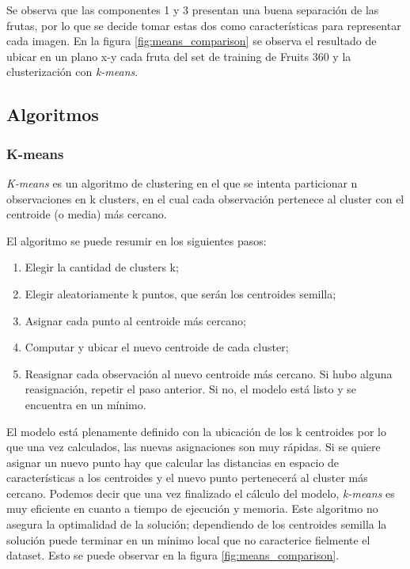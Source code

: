 \documentclass[10pt, a4paper]{article}
\begin{document}
Se observa que las componentes 1 y 3 presentan una buena separación de las frutas, por lo que se decide tomar estas dos como características para representar cada imagen. En la figura \ref{fig:means_comparison} se observa el resultado de ubicar en un plano x-y cada fruta del set de training de Fruits 360 y la clusterización con \textit{k-means}.


\subsection{Algoritmos}

\subsubsection{K-means}

\textit{K-means} es un algoritmo de clustering en el que se intenta particionar n observaciones en k clusters, en el cual cada observación pertenece al cluster con el centroide (o media) más cercano. 

El algoritmo se puede resumir en los siguientes pasos: 

\begin{enumerate}
    \item Elegir la cantidad de clusters k;
    \item Elegir aleatoriamente k puntos, que serán los centroides semilla;
    \item Asignar cada punto al centroide más cercano;
    \item Computar y ubicar el nuevo centroide de cada cluster;
    \item Reasignar cada observación al nuevo centroide más cercano. Si hubo alguna reasignación, repetir el paso anterior. Si no, el modelo está listo y se encuentra en un mínimo. 
\end{enumerate}

El modelo está plenamente definido con la ubicación de los k centroides por lo que una vez calculados, las nuevas asignaciones son muy rápidas. Si se quiere asignar un nuevo punto hay que calcular las distancias en espacio de características a los centroides y el nuevo punto pertenecerá al cluster más cercano. Podemos decir que una vez finalizado el cálculo del modelo, \textit{k-means} es muy eficiente en cuanto a tiempo de ejecución y memoria. Este algoritmo no asegura la optimalidad de la solución; dependiendo de los centroides semilla la solución puede terminar en un mínimo local que no caracterice fielmente el dataset. Esto se puede observar en la figura \ref{fig:means_comparison}.
\end{document}
